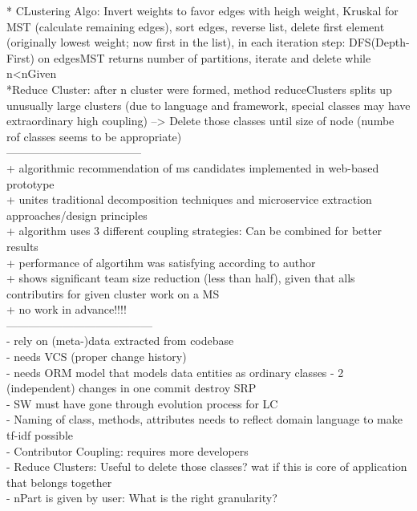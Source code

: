 * CLustering Algo: Invert weights to favor edges  with heigh weight, Kruskal for MST (calculate remaining edges), sort edges, reverse list, delete first element (originally lowest weight; now first in the list), in each iteration step: DFS(Depth-First) on edgesMST returns number of partitions, iterate and delete while n<nGiven\\
*Reduce Cluster: after n cluster were formed, method reduceClusters splits up unusually large clusters (due to language and framework, special classes may have extraordinary high coupling) --> Delete those classes until size of node (numbe rof classes seems to be appropriate)\\
------------------------------------\\


+ algorithmic recommendation of ms candidates implemented in web-based prototype\\
+ unites traditional decomposition techniques and microservice extraction approaches/design principles\\
+ algorithm uses 3 different coupling strategies: Can be combined for better results\\
+ performance of algortihm was satisfying according to author\\
+ shows significant team size reduction (less than half), given that alls contributirs for given cluster work on a MS\\
+ no work in advance!!!!\\

---------------------------------------\\


- rely on (meta-)data extracted from codebase\\
- needs VCS (proper change history)\\
- needs ORM model that models data entities as ordinary classes
- 2 (independent) changes in one commit destroy SRP\\
- SW must have gone through evolution process for LC\\
- Naming of class, methods, attributes needs to reflect domain language to make tf-idf possible\\
- Contributor Coupling: requires more developers\\
- Reduce Clusters: Useful to delete those classes? wat if this is core of application that belongs together\\
- nPart is given by user: What is the right granularity?\\

